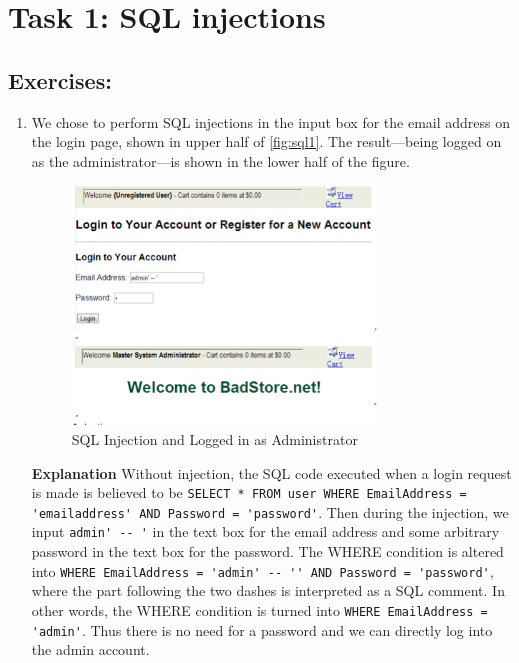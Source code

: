 \section*{Task 1: SQL injections}

\subsection*{Exercises:}
\begin{enumerate}
\item {}

We chose to perform SQL injections in the input box for the email address on the login page, shown in upper half of \autoref{fig:sql1}. The result---being logged on as the administrator---is shown in the lower half of the figure.
\begin{figure}[h!]
	\caption{SQL Injection and Logged in as Administrator}
        \label{fig:sql1}
	\centering \includegraphics[height=2.5in]{sqli1}
\end{figure}
  
  \textbf{Explanation} Without injection, the SQL code executed when a login request is made is believed to be \lstinline{SELECT * FROM user WHERE EmailAddress = 'emailaddress' AND Password = 'password'}. Then during the injection, we input \lstinline{admin' -- '} in the text box for the email address and some arbitrary password in the text box for the password. The WHERE condition is altered into \lstinline{WHERE EmailAddress = 'admin' -- '' AND Password = 'password'}, where the part following the two dashes is interpreted as a SQL comment. In other words, the WHERE condition is turned into \lstinline{WHERE EmailAddress = 'admin'}. Thus there is no need for a password and we can directly log into the admin account.


\end{enumerate}
